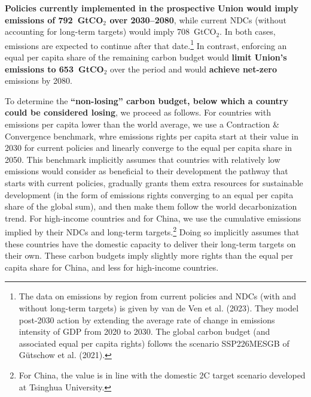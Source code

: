 \documentclass[12pt,english]{article}
\begin{document}
\textbf{Policies currently implemented in the prospective Union would imply emissions of 792~GtCO$_\text{2}$ over 2030--2080}, while current NDCs (without accounting for long-term targets) would imply 708~GtCO$_\text{2}$. In both cases, emissions are expected to continue after that date.\footnote{The data on emissions by region from current policies and NDCs (with and without long-term targets) is given by van de Ven et al. (2023)\cite{van_de_ven_multimodel_2023}. They model post-2030 action by extending the average rate of change in emissions intensity of GDP from 2020 to 2030. The global carbon budget (and associated equal per capita rights) follows the scenario SSP226MESGB of Gütschow et al. (2021).\cite{gutschow_country-resolved_2021}} %
In contrast, enforcing an equal per capita share of the remaining carbon budget would \textbf{limit Union's emissions to 653~GtCO$_\text{2}$} over the period and would \textbf{achieve net-zero} emissions by 2080.

To determine the \textbf{``non-losing'' carbon budget, below which a country could be considered losing}, we proceed as follows. For countries with emissions per capita lower than the world average, we use a Contraction \& Convergence benchmark, whre emissions rights per capita start at their value in 2030 for current policies and linearly converge to the equal per capita share in 2050. This benchmark implicitly assumes that countries with relatively low emissions would consider as beneficial to their development the pathway that starts with current policies, gradually grants them extra resources for sustainable development (in the form of emissions rights converging to an equal per capita share of the global sum), and then make them follow the world decarbonization trend. 
For high-income countries and for China, we use the cumulative emissions implied by their NDCs and long-term targets.\footnote{For China, the value is in line with the domestic 2\textdegree{}C target scenario developed at Tsinghua University.\cite{he_towards_2022}} Doing so implicitly assumes that these countries have the domestic capacity to deliver their long-term targets on their own. These carbon budgets imply slightly more rights than the equal per capita share for China, and less for high-income countries. 
\end{document}
